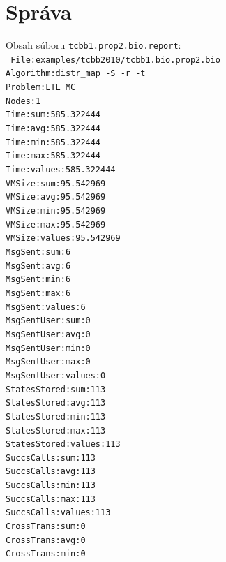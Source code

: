 \documentclass[11pt,final,oneside]{fithesis}
\begin{document}
\section{Spr\'ava}
\label{sec:prop2report}
Obsah s\'uboru {\tt tcbb1.prop2.bio.report}:\\

{\tt\noindent
File:examples/tcbb2010/tcbb1.bio.prop2.bio\\
Algorithm:distr\_map -S -r -t\\
Problem:LTL MC\\
Nodes:1\\
Time:sum:585.322444\\
Time:avg:585.322444\\
Time:min:585.322444\\
Time:max:585.322444\\
Time:values:585.322444\\
VMSize:sum:95.542969\\
VMSize:avg:95.542969\\
VMSize:min:95.542969\\
VMSize:max:95.542969\\
VMSize:values:95.542969\\
MsgSent:sum:6\\
MsgSent:avg:6\\
MsgSent:min:6\\
MsgSent:max:6\\
MsgSent:values:6\\
MsgSentUser:sum:0\\
MsgSentUser:avg:0\\
MsgSentUser:min:0\\
MsgSentUser:max:0\\
MsgSentUser:values:0\\
StatesStored:sum:113\\
StatesStored:avg:113\\
StatesStored:min:113\\
StatesStored:max:113\\
StatesStored:values:113\\
SuccsCalls:sum:113\\
SuccsCalls:avg:113\\
SuccsCalls:min:113\\
SuccsCalls:max:113\\
SuccsCalls:values:113\\
CrossTrans:sum:0\\
CrossTrans:avg:0\\
CrossTrans:min:0\\
}
\end{document}
